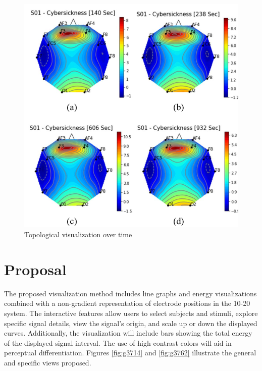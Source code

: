 \documentclass[format=sigconf]{acmart}
\begin{document}
			\begin{figure}[h]
				\centering
				\includegraphics[width=\linewidth]{../presentation/images/visu02}
				\caption{Topological visualization over time}
				\label{fig:visu02}
			\end{figure}
	
	\section{Proposal}
		\par The proposed visualization method includes line graphs and energy visualizations combined with a non-gradient representation of electrode positions in the 10-20 system. The interactive features allow users to select subjects and stimuli, explore specific signal details, view the signal's origin, and scale up or down the displayed curves. Additionally, the visualization will include bars showing the total energy of the displayed signal interval. The use of high-contrast colors will aid in perceptual differentiation. Figures \ref{fig:g3714} and \ref{fig:g3762} illustrate the general and specific views proposed.
	
\end{document}
